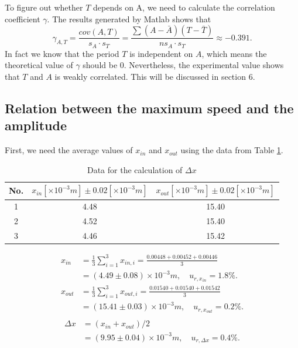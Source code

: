     To figure out whether $T$ depends on A, we need to calculate the correlation coefficient $\gamma$. The results generated by Matlab shows that
    \[
        \gamma_{A,T}=\frac{cov(A,T)}{s_A\cdot s_T}=\frac{\sum(A-\bar{A})(T-\bar{T})}{ns_A\cdot s_T}\approx -0.391.
    \]
    In fact we know that the period $T$ is independent on $A$, which means the theoretical value of $\gamma$ should be $0$. Nevertheless, the experimental value shows that $T$ and $A$ is weakly correlated. This will be discussed in section 6.

\subsection{Relation between the maximum speed and the amplitude}
    First, we need the average values of $x_{in}$ and $x_{out}$ using the data from Table \ref{x}.
    \begin{table}[h] \small
        \centering
        \begin{tabular}{|c|c|c|}
            \hline
            No. & $x_{in}[\times10^{-3}m]\pm 0.02[\times10^{-3}m]$ & $x_{out}[\times10^{-3}m]\pm 0.02[\times10^{-3}m]$\\ \hline
            1 & 4.48 & 15.40\\ \hline
            2 & 4.52 & 15.40\\ \hline
            3 & 4.46 & 15.42\\ \hline
        \end{tabular}
        \caption{Data for the calculation of $\Delta x$}\label{x}
    \end{table}
    \[
    \begin{split}
        x_{in}&=\frac{1}{3}\sum_{i=1}^{3}x_{in,i}=\frac{0.00448+0.00452+0.00446}{3}\\
        &=(4.49\pm0.08)\times10^{-3}m,\quad u_{r,x_{in}}=1.8\%.\\[0.4cm]
        x_{out}&=\frac{1}{3}\sum_{i=1}^{3}x_{out,i}=\frac{0.01540+0.01540+0.01542}{3}\\
        &=(15.41\pm0.03)\times10^{-3}m,\quad u_{r,x_{out}}=0.2\%.\\
    \end{split}
    \]
    \[
    \begin{split}
        \Delta x&=(x_{in}+x_{out})/2\\
        &=(9.95\pm0.04)\times10^{-3}m,\quad u_{r,\Delta x}=0.4\%.
    \end{split}
    \]

